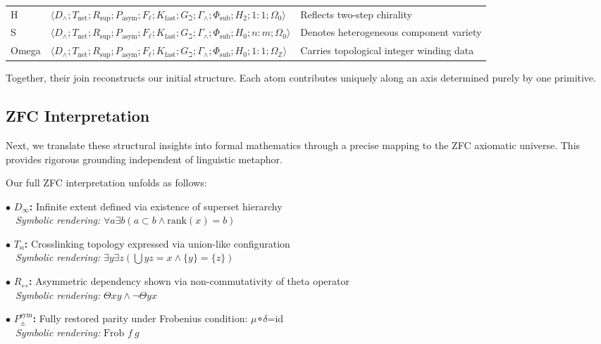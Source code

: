 \documentclass[12pt,a4paper]{article}
\begin{document}
\begin{table}[htbp]
\begin{tabularx}{\textwidth}{>{\centering\arraybackslash}X >{\centering\arraybackslash}X >{\centering\arraybackslash}X}
H & $\langle D_{\wedge}; T_\text{net}; R_\text{sup}; P_\text{asym}; F_{\ell}; K_\text{fast}; G_{\beth}; \Gamma_{\wedge}; \Phi_\text{sub}; H_2; 1{:}1; \Omega_0 \rangle$ & Reflects two-step chirality \\
S & $\langle D_{\wedge}; T_\text{net}; R_\text{sup}; P_\text{asym}; F_{\ell}; K_\text{fast}; G_{\beth}; \Gamma_{\wedge}; \Phi_\text{sub}; H_0; n{:}m; \Omega_0 \rangle$ & Denotes heterogeneous component variety \\
Omega & $\langle D_{\wedge}; T_\text{net}; R_\text{sup}; P_\text{asym}; F_{\ell}; K_\text{fast}; G_{\beth}; \Gamma_{\wedge}; \Phi_\text{sub}; H_0; 1{:}1; \Omega_\mathbb{Z} \rangle$ & Carries topological integer winding data \\
\bottomrule
\end{tabularx}
\end{table}

Together, their join reconstructs our initial structure. Each atom contributes uniquely along an axis determined purely by one primitive.

\subsection{ZFC Interpretation}

Next, we translate these structural insights into formal mathematics through a precise mapping to the ZFC axiomatic universe. This provides rigorous grounding independent of linguistic metaphor.

Our full ZFC interpretation unfolds as follows:

$\bullet$ \textbf{$D_{\infty}$:} Infinite extent defined via existence of superset hierarchy \\
 \emph{Symbolic rendering:} $\forall a \exists b( a \subset b \wedge \text{rank}(x) = b)$

$\bullet$ \textbf{$T_{\bowtie}$:} Crosslinking topology expressed via union-like configuration \\
 \emph{Symbolic rendering:} $\exists y \exists z( ⋃ y z = x \wedge \{y\} = \{z\})$

$\bullet$ \textbf{$R_{\leftrightarrow}$:} Asymmetric dependency shown via non-commutativity of theta operator \\
 \emph{Symbolic rendering:} $\Theta x y \wedge \neg \Theta y x$

$\bullet$ \textbf{$P_{\pm}^{\text{sym}}$:} Fully restored parity under Frobenius condition: $\mu$∘$\delta$=id \\
 \emph{Symbolic rendering:} $\text{Frob } f\ g$
\end{document}
